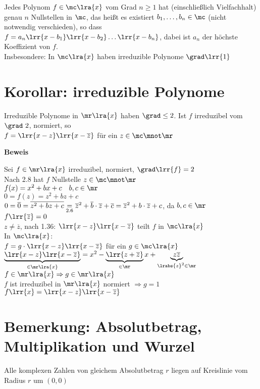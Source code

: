 	Jedes Polynom $f\in\mc\lra{x}$ vom Grad $n\geq 1$ hat (einschließlich Vielfachhalt) genau $n$ Nullstellen in $\mc$, das heißt es existiert $b_1,\dots,b_n\in\mc$ (nicht notwendig verschieden), so dass $f=a_n\lrr{x-b_1}\lrr{x-b_2}\dots\lrr{x-b_n}$, dabei ist $a_n$ der höchste Koeffizient von $f$. \\
	Insbesondere: In $\mc\lra{x}$ haben irreduzible Polynome $\grad\lrr{1}$

\section{Korollar: irreduzible Polynome}
	Irreduzible Polynome in $\mr\lra{x}$ haben $\grad\leq 2$. Ist $f$ irreduzibel vom $\grad\ 2$, normiert, so \\
	$f=\lrr{x-z}\lrr{x-\overline{z}}$ für ein $z\in\mc\mnot\mr$

	\textbf{Beweis}

	Sei $f\in\mr\lra{x}$ irreduzibel, normiert, $\grad\lrr{f}=2$\\
	Nach 2.8 hat $f$ Nullstelle $z\in\mc\mnot\mr$\\
	$f(x)=x^2+bx+c\quad b,c\in\mr$\\
	$0=f(z)=z^2+bz+c$\\
	$0=\overline{0}=\overline{z^2+bz+c} \underset{\mbox{\scriptsize 2.6}}{=}\overline{z}^2+\overline{b}\cdot\overline{z}+\overline{c}=\overline{z}^2+b\cdot\overline{z}+c$, da $b,c\in\mr$\\
	$f\lrr{\overline{z}}=0$\\
	$z\neq\overline{z}$, nach 1.36: $\lrr{x-z}\lrr{x-\overline{z}}$ teilt $f$ in $\mc\lra{x}$\\
	In $\mc\lra{x}$:\\
	$f=g\cdot\lrr{x-z}\lrr{x-\overline{z}}$ für ein $g\in\mc\lra{x}$\\
	$\underbrace{\lrr{x-z}\lrr{x-\overline{z}}}_{\in\mr\lra{x}}=x^2-\underbrace{\lrr{z+\overline{z}}}_{\in\mr}x+\underbrace{z\overline{z}}_{\scriptstyle \lrabs{z}^2\in\mr}$\\
	$f\in\mr\lra{x}\Rightarrow g\in\mr\lra{x}$\\
	$f$ ist irreduzibel in $\mr\lra{x}$ normiert $\Rightarrow g=1$\\
	$f\lrr{x}=\lrr{x-z}\lrr{x-\overline{z}}$

\section{Bemerkung: Absolutbetrag, Multiplikation und Wurzel}
		\item Alle komplexen Zahlen von gleichem Absolutbetrag $r$ liegen auf Kreislinie vom Radius $r$ um $(0,0)$

